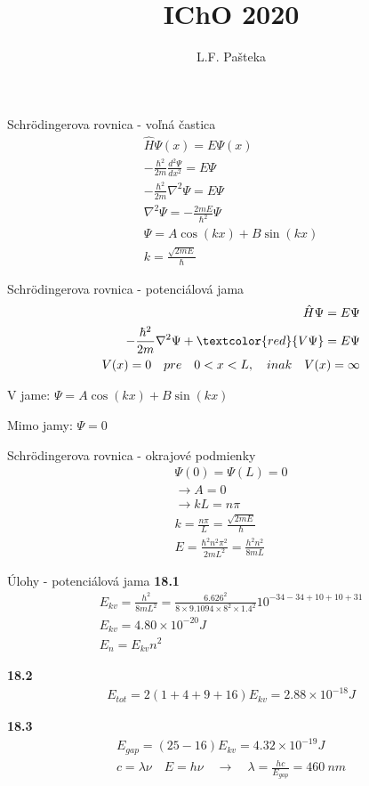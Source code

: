 \documentclass{beamer}
\title[Your Short Title]{IChO 2020}
\author{L.F. Pa\v{s}teka}
\begin{document}
\begin{frame}
  \titlepage
\end{frame}


\begin{frame}{Schr\"{o}dingerova rovnica - voľná častica}
\begin{align*}
\hat{H} \Psi(x) = E \Psi(x) \\
-\frac{\hbar^2}{2m} \frac{d^2\Psi}{dx^2} = E \Psi \\
-\frac{\hbar^2}{2m} \nabla^2\Psi = E \Psi \\
\nabla^2\Psi = -\frac{2mE}{\hbar^2} \Psi \\
\Psi = A \cos(kx) + B \sin(kx)\\
k=\frac{\sqrt{2mE}}{\hbar}
\end{align*}
\end{frame}


\begin{frame}{Schr\"{o}dingerova rovnica - potenciálová jama}
\begin{align*}
\hat{H} \Psi = E \Psi \\
-\frac{\hbar^2}{2m} \nabla^2\Psi +\textcolor{red}{V\Psi} = E \Psi \\
V(x)=0 \quad pre \quad 0<x<L, \quad inak \quad V(x)=\infty
\end{align*}

V jame: $\Psi = A \cos(kx) + B \sin(kx)$

Mimo jamy: $\Psi = 0$
\end{frame}


\begin{frame}{Schr\"{o}dingerova rovnica - okrajové podmienky}
\begin{align*}
\Psi(0)=\Psi(L)=0 \\
\rightarrow A = 0 \\
\rightarrow k L=n\pi \\
k=\frac{n\pi}{L}=\frac{\sqrt{2mE}}{\hbar}\\
E=\frac{\hbar^2n^2\pi^2}{2mL^2}=\boxed{\frac{h^2n^2}{8mL}}
\end{align*}
\end{frame}


\begin{frame}{Úlohy - potenciálová jama}
\textbf{18.1}
\begin{align*}
E_{kv}=\frac{h^2}{8mL^2}=\frac{6.626^2}{8 \times 9.1094 \times 8^2 \times 1.4^2} 10^{-34-34+10+10+31}\\
E_{kv}=4.80 \times 10^{-20} J \\
E_n=E_{kv} n^2
\end{align*}

\textbf{18.2}
\begin{align*}
E_{tot} = 2(1+4+9+16) E_{kv} = 2.88 \times 10^{-18} J
\end{align*} 

\textbf{18.3}
\begin{align*}
E_{gap} = (25-16) E_{kv} = 4.32 \times 10^{-19} J \\
c=\lambda\nu \quad E=h\nu \quad \rightarrow \quad \lambda=\frac{h c}{E_{gap}} = 460 \: nm
\end{align*} 
\end{frame}
\end{document}
